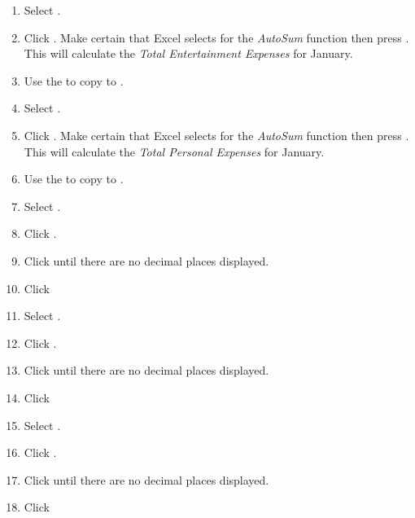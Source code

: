 \begin{enumbox}
\begin{enumerate}
		\item Select .
		\item Click . Make certain that Excel selects  for the \textit{AutoSum} function then press . This will calculate the \textit{Total Entertainment Expenses} for January.
		\item Use the  to copy  to .
	
		\item Select .
		\item Click . Make certain that Excel selects  for the \textit{AutoSum} function then press . This will calculate the \textit{Total Personal Expenses} for January.
		\item Use the  to copy  to .
		
		\item Select .
		\item Click .
		\item Click  until there are no decimal places displayed.
		\item Click  
		
		\item Select .
		\item Click .
		\item Click  until there are no decimal places displayed.
		\item Click  
	
		\item Select .
		\item Click .
		\item Click  until there are no decimal places displayed.
		\item Click  
	

\end{enumerate}
\end{enumbox}

